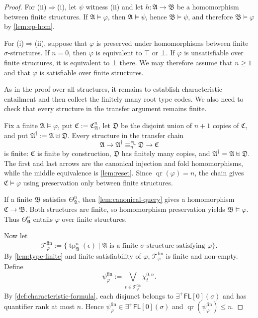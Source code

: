\documentclass{lmcs}
\newcommand{\FL}{\mathsf{FL}}
\newcommand{\EPFL}{\exists^{+}\!\mathsf{FL}}
\newcommand{\qr}{\operatorname{qr}}
\newcommand{\tp}{\operatorname{tp}}
\newcommand{\true}{\top}
\newcommand{\false}{\bot}
\newcommand{\A}{\mathfrak{A}}
\newcommand{\B}{\mathfrak{B}}
\newcommand{\C}{\mathfrak{C}}
\newcommand{\D}{\mathfrak{D}}
\begin{document}
\begin{proof}
For \textup{(ii)}$\Rightarrow$\textup{(i)}, let $\psi$ witness
\textup{(ii)} and let $h:\A\to\B$ be a homomorphism between finite structures.
If $\A\models\varphi$, then $\A\models\psi$, hence $\B\models\psi$, and
therefore $\B\models\varphi$ by \cref{lem:ep-hom}.

For \textup{(i)}$\Rightarrow$\textup{(ii)}, suppose that $\varphi$ is
preserved under homomorphisms between finite $\sigma$-structures.  If $n=0$,
then $\varphi$ is equivalent to $\true$ or $\false$.  If $\varphi$ is
unsatisfiable over finite structures, it is equivalent to $\false$ there.  We
may therefore assume that $n\geq1$ and that $\varphi$ is satisfiable over
finite structures.

As in the proof over all structures, it remains to establish characteristic
entailment and then collect the finitely many root type codes.  We also need
to check that every structure in the transfer argument remains finite.

Fix a finite $\A\models\varphi$, put $\C:=\C_{\A}^{n}$, let $\D$ be the
disjoint union of $n+1$ copies of $\C$, and put
$\A^{\dagger}:=\A\uplus\D$.  Every structure in the transfer chain
\[
   \A\longrightarrow\A^{\dagger}
   \equiv_n^{\FL}\D
   \longrightarrow\C
\]
is finite: $\C$ is finite by construction, $\D$ has finitely many copies, and
$\A^{\dagger}=\A\uplus\D$.  The first and last arrows are the canonical
injection and fold homomorphisms, while the middle equivalence is
\cref{lem:reset}.  Since $\qr(\varphi)=n$, the chain gives
$\C\models\varphi$ using preservation only between finite structures.

If a finite $\B$ satisfies $\Theta_{\A}^{n}$, then
\cref{lem:canonical-query} gives a homomorphism $\C\to\B$.  Both structures
are finite, so homomorphism preservation yields $\B\models\varphi$.  Thus
$\Theta_{\A}^{n}$ entails $\varphi$ over finite structures.

Now let
\[
  \mathcal T_{\varphi}^{\mathrm{fin}}
  :=
  \bigl\{
    \tp_{\A}^{n}(\epsilon)
    \mid
    \A\text{ is a finite $\sigma$-structure satisfying }\varphi
  \bigr\}.
\]
By \cref{lem:type-finite} and finite satisfiability of $\varphi$,
$\mathcal T_{\varphi}^{\mathrm{fin}}$ is finite and non-empty.  Define
\[
  \psi_{\varphi}^{\mathrm{fin}}
  :=
  \bigvee_{t\in\mathcal T_{\varphi}^{\mathrm{fin}}}\chi_t^{0,n}.
\]
By \cref{def:characteristic-formula}, each disjunct belongs to
$\EPFL[0](\sigma)$ and has quantifier rank at most $n$.  Hence
$\psi_{\varphi}^{\mathrm{fin}}\in\EPFL[0](\sigma)$ and
$\qr(\psi_{\varphi}^{\mathrm{fin}})\leq n$.


\end{proof}
\end{document}
